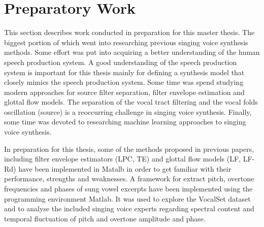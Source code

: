 \chapter{Preparatory Work}

This section describes work conducted in preparation for this master thesis. The biggest portion of which went into researching previous singing voice synthesis methods. Some effort was put into acquiring a better understanding of the human speech production system. A good understanding of the speech production system is important for this thesis mainly for defining a synthesis model that closely mimics the speech production system. Some time was spend studying modern approaches for source filter separation, filter envelope estimation and glottal flow models. The separation of the vocal tract filtering and the vocal folds oscillation (source) is a reoccurring challenge in singing voice synthesis. Finally, some time was devoted to researching machine learning approaches to singing voice synthesis.

In preparation for this thesis, some of the methods proposed in previous papers, including filter envelope estimators (LPC, TE) and glottal flow models (LF, LF-Rd) have been implemented in Matalb in order to get familiar with their performance, strengths and weaknesses. A framework for extract pitch, overtone frequencies and phases of sung vowel excerpts have been implemented using the programming environment Matlab. It was used to explore the VocalSet dataset\cite{wilkins_vocalset:_2018} and to analyse the included singing voice experts regarding spectral content and temporal fluctuation of pitch and overtone amplitude and phase. 
